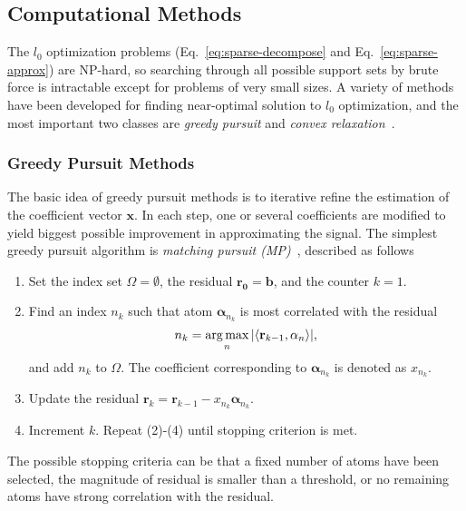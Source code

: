 \subsection{Computational Methods}
The $l_0$ optimization problems (Eq.~\ref{eq:sparse-decompose} and Eq.~\ref{eq:sparse-approx}) are NP-hard,
so searching through all possible support sets by brute force is intractable except for problems of very small
sizes. A variety of methods have been developed for finding near-optimal solution to $l_0$ optimization, and
the most important two classes are \emph{greedy pursuit} and \emph{convex relaxation}~\cite{Tropp2010}.

\subsubsection*{Greedy Pursuit Methods}
The basic idea of greedy pursuit methods is to iterative refine the estimation of the coefficient vector
$\mathbf{x}$. In each step, one or several coefficients are modified to yield biggest possible improvement
in approximating the signal. The simplest greedy pursuit algorithm is \emph{matching pursuit (MP)}~\cite{Mallat1993},
described as follows
\begin{enumerate}
\item Set the index set $\Omega=\emptyset$, the residual $\mathbf{r_0} = \mathbf{b}$, and the counter $k=1$.
\item Find an index $n_k$ such that atom $\mathbf{\alpha}_{n_k}$ is most correlated with the residual
\begin{equation*}
n_k = \operatorname*{arg\,max}_n |\langle \mathbf{r}_{k-1},\mathbf{\alpha}_{n} \rangle|,
\end{equation*}
and add $n_k$ to $\Omega$. The coefficient corresponding to $\mathbf{\alpha}_{n_k}$ is denoted as $x_{n_k}$.

\item Update the residual $\mathbf{r}_k = \mathbf{r}_{k-1} - x_{n_k} \mathbf{\alpha}_{n_k}$.
\item Increment $k$. Repeat (2)-(4) until stopping criterion is met.
\end{enumerate}

The possible stopping criteria can be that a fixed number of atoms have been selected, the magnitude of residual is
smaller than a threshold, or no remaining atoms have strong correlation with the residual.

